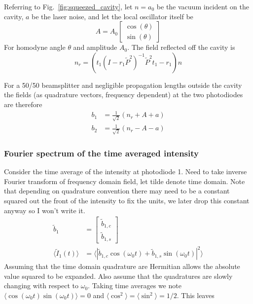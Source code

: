\documentclass[aps,pra,superscriptaddress,reprint,nofootinbib]{revtex4-1}
\newcommand{\abs}[1]{\left\lvert #1 \right\rvert}
\newcommand{\expect}[1]{\langle #1 \rangle}
\begin{document}
Referring to Fig.~\ref{fig:squeezed_cavity}, let $n = a_0$ be the vacuum incident on the cavity, $a$ be the laser noise, and let the local oscillator itself be
\begin{equation}
A = A_0 \begin{bmatrix}
\cos(\theta)\\ 
\sin(\theta)
\end{bmatrix}
\end{equation}
For homodyne angle $\theta$ and amplitude $A_0$. The field reflected off the cavity is
\begin{equation}
n_r = \left(t_1 (I - r_1 \tilde{P}^2)^{-1} \tilde{P}^2 t_1 - r_1 \right) n
\end{equation}


For a 50/50 beamsplitter and negligible propagation lengths outside the cavity the fields (as quadrature vectors, frequency dependent) at the two photodiodes are therefore
\begin{align}
b_1 &= \frac{1}{\sqrt{2}} \left( n_r + A + a\right) \\
b_2 &= \frac{1}{\sqrt{2}} \left( n_r - A - a\right)\nonumber
\end{align}

\subsubsection{Fourier spectrum of the time averaged intensity}

Consider the time average of the intensity at photodiode 1. Need to take inverse Fourier transform of frequency domain field, let tilde denote time domain. Note that depending on quadrature convention there may need to be a constant squared out the front of the intensity to fix the units, we later drop this constant anyway so I won’t write it. 
\begin{align}
\tilde{b}_1 &= \begin{bmatrix}
\tilde{b}_{1,c}\\ 
\tilde{b}_{1,s}
\end{bmatrix} \\
\expect{\tilde{I}_1(t)} &= \expect{\abs{\tilde{b}_{1,c} \cos(\omega_0 t) + \tilde{b}_{1,s} \sin(\omega_0 t)}^2}
\end{align}
Assuming that the time domain quadrature are Hermitian allows the absolute value squared to be expanded. Also assume that the quadratures are slowly changing with respect to $\omega_0$. Taking time averages we note $\expect{\cos(\omega_0 t) \sin(\omega_0 t)} = 0$ and $\expect{\cos^2} = \expect{\sin^2} = 1/2$. This leaves
\end{document}
